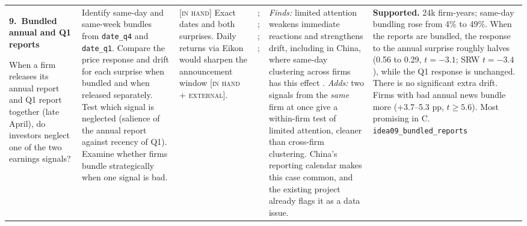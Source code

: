 \documentclass[10pt]{article}
\newcommand{\idea}[2]{\textbf{#1.\ #2}\par\smallskip}
\newcommand{\inhand}{\textsc{[in hand]}}
\newcommand{\ext}{\textsc{[in hand + external]}}
\begin{document}
{\begin{longtable}{@{}L{3.2cm}L{4.4cm}L{2.5cm}L{3.0cm}L{5.4cm}L{5.8cm}@{}}
\idea{9}{Bundled annual and Q1 reports}
When a firm releases its annual report and Q1 report together (late April), do investors neglect one of the two
earnings signals?
&
Identify same-day and same-week bundles from \texttt{date\_q4} and \texttt{date\_q1}. Compare the price response
and drift for each surprise when bundled and when released separately. Test which signal is neglected (salience
of the annual report against recency of Q1). Examine whether firms bundle strategically when one signal is bad.
&
\inhand{} Exact dates and both surprises. Daily returns via Eikon would sharpen the announcement window \ext.
&
\citet{hirshleifer2003}; \citet{hirshleifer2009}; \citet{dellavigna2009}; \citet{you2011}; \citet{cohen2012}
&
\emph{Finds:} limited attention weakens immediate reactions and strengthens drift, including in China, where same-day
clustering across firms has this effect \citep{hirshleifer2009,you2011}. \emph{Adds:} two signals from the
\emph{same} firm at once give a within-firm test of limited attention, cleaner than cross-firm clustering. China's
reporting calendar makes this case common, and the existing project already flags it as a data issue.
&
\textbf{Supported.} 24k firm-years; same-day bundling rose from 4\% to 49\%. When the reports are bundled, the response to the annual surprise roughly halves (0.56 to 0.29, $t=-3.1$; SRW $t=-3.4$), while the Q1 response is unchanged. There is no significant extra drift. Firms with bad annual news bundle more (+3.7--5.3 pp, $t\geq5.6$). Most promising in C. \texttt{idea09\_bundled\_reports}\\[4pt]


\end{longtable}}
\end{document}
